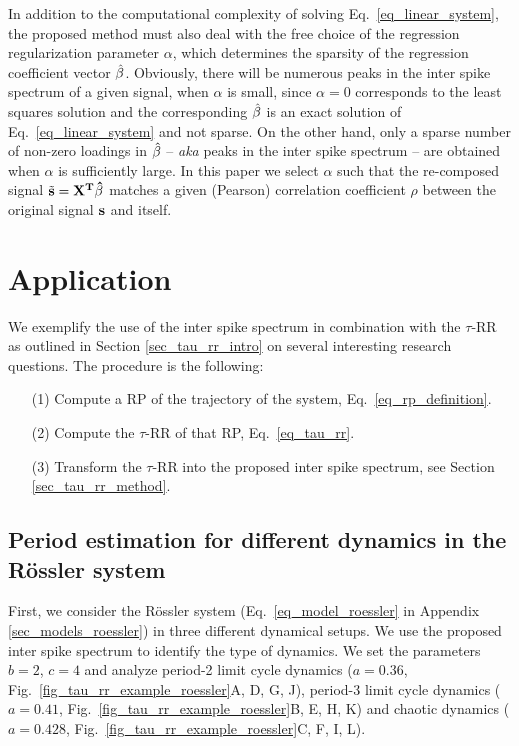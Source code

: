 In addition to the computational complexity of solving Eq.~\eqref{eq_linear_system}, the proposed method must also deal with the free choice of the regression regularization parameter $\alpha$, 
which determines the sparsity of the regression coefficient vector $\hat{\bf{\beta}}$. Obviously, there will be numerous peaks in the inter spike spectrum of a given signal, when $\alpha$ is small, 
since $\alpha=0$ corresponds to the least squares solution and the corresponding $\hat{\bf{\beta}}$ is an exact solution of Eq.~\ref{eq_linear_system} and not sparse. On the other hand, only a sparse number 
of non-zero loadings in $\hat{\bf{\beta}}$ -- \textit{aka} peaks in the inter spike spectrum -- are obtained when $\alpha$ is sufficiently large. In this paper we select $\alpha$ such that the 
re-composed signal $\tilde{\bf{s}}=\bf{X}^T\hat{\bf{\beta}}$ matches a given (Pearson) correlation coefficient $\rho$ between the original signal $\bf{s}$ and itself.

\section{Application}\label{sec_tau_rr_application}

We exemplify the use of the inter spike spectrum in combination with the $\tau$-RR as outlined in 
Section \ref{sec_tau_rr_intro} on several interesting research questions. The procedure is the following:
\begin{itemize}[noitemsep]
\item[(1)] Compute a RP of the trajectory of the system, Eq.~\eqref{eq_rp_definition}. 
\item[(2)] Compute the $\tau$-RR of that RP, Eq.~\eqref{eq_tau_rr}.
\item[(3)] Transform the $\tau$-RR into the proposed inter spike spectrum, see Section \ref{sec_tau_rr_method}.
\end{itemize}

\subsection{Period estimation for different dynamics in the R\"ossler system}
First, we consider the R\"ossler system (Eq.~\eqref{eq_model_roessler} in Appendix \ref{sec_models_roessler}) 
in three different dynamical setups. We use the proposed inter spike spectrum to
identify the type of dynamics.
We set the parameters $b=2$, $c=4$ and analyze period-2 limit cycle dynamics ($a=0.36$, Fig.~\ref{fig_tau_rr_example_roessler}A, D, G, J), 
period-3 limit cycle dynamics ($a=0.41$, Fig.~\ref{fig_tau_rr_example_roessler}B, E, H, K) and chaotic dynamics ($a=0.428$, Fig.~\ref{fig_tau_rr_example_roessler}C, F, I, L).  

